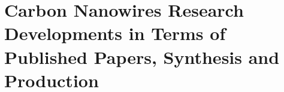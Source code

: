 
\chapter{Carbon Nanowires Research Developments in Terms of Published Papers, Synthesis and Production} %

\label{Chapter:2}

\section{}


